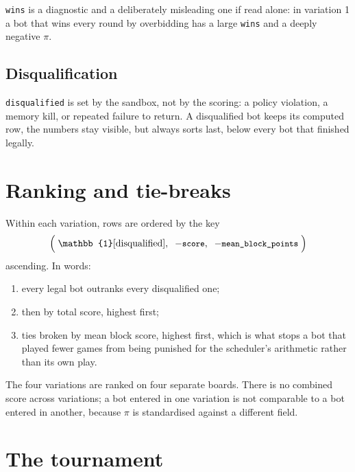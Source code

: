 \documentclass[11pt,a4paper]{article}
\newif\ifreleased
\newcommand{\code}[1]{\texttt{\small #1}}
\begin{document}
\noindent
\code{wins} is a diagnostic and a deliberately misleading one if read alone: in
variation 1 a bot that wins every round by overbidding has a large \code{wins}
and a deeply negative $\pi$.\ifreleased{} In variation 4 rank 1 and rank 2 are
\emph{both} paid, so \code{wins} counts only half the times the bot was in the
money.\fi

\subsection{Disqualification}
\code{disqualified} is set by the sandbox, not by the scoring: a policy
violation, a memory kill, or repeated failure to return. A disqualified bot
keeps its computed row, the numbers stay visible, but always sorts last,
below every bot that finished legally.

\section{Ranking and tie-breaks}
\label{sec:ranking}

Within each variation, rows are ordered by the key
\begin{equation}
  \Big(\;\mathbb{1}[\text{disqualified}],\;\; -\text{\code{score}},\;\;
        -\text{\code{mean\_block\_points}}\;\Big)
\end{equation}
ascending. In words:
\begin{enumerate}[nosep]
  \item every legal bot outranks every disqualified one;
  \item then by total score, highest first;
  \item ties broken by mean block score, highest first, which is what stops a
        bot that played fewer games from being punished for the scheduler's
        arithmetic rather than its own play.
\end{enumerate}
The four variations are ranked on four separate boards. There is no combined
score across variations; a bot entered in one variation is not comparable to a
bot entered in another, because $\pi$ is standardised against a different field.

\section{The tournament}
\label{sec:tournament}
\end{document}
